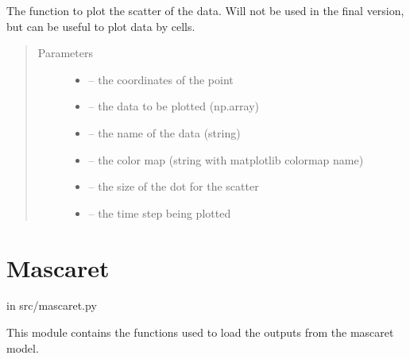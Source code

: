 \documentclass[letterpaper,10pt,english]{sphinxmanual}
\begin{document}
\begin{fulllineitems}
\label{\detokenize{index:src.hec_ras2D.scatter_plot}}
The function to plot the scatter of the data. Will not be used in the final version, but can be useful to
plot data by cells.
\begin{quote}\begin{description}
\item[{Parameters}] \leavevmode\begin{itemize}
\item {} 
 -- the coordinates of the point

\item {} 
 -- the data to be plotted (np.array)

\item {} 
 -- the name of the data (string)

\item {} 
 -- the color map (string with matplotlib colormap name)

\item {} 
 -- the size of the dot for the scatter

\item {} 
 -- the time step being plotted

\end{itemize}

\end{description}\end{quote}

\end{fulllineitems}



\section{Mascaret}
\label{\detokenize{index:mascaret}}
in src/mascaret.py

This module contains the functions used to load the outputs from the mascaret model.
\label{\detokenize{index:module-src.mascaret}}
\end{document}
